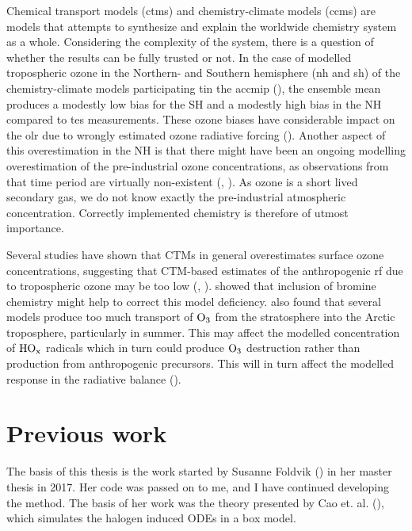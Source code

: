 \medskip

Chemical transport models (\acrshort{ctm}s) and chemistry-climate models (\acrshort{ccm}s) are models that attempts to synthesize and explain the worldwide chemistry system as a whole. Considering the complexity of the system, there is a question of whether the results can be fully trusted or not. In the case of modelled tropospheric ozone in the Northern- and Southern hemisphere (\acrshort{nh} and \acrshort{sh}) of the chemistry-climate models participating tin the \acrfull{accmip} (\cite{Bowman2013}), the ensemble mean produces a modestly low bias for the SH and a modestly high bias in the NH compared to \acrfull{tes} measurements. These ozone biases have considerable impact on the \acrfull{olr} due to wrongly estimated ozone radiative forcing (\cite{Bowman2013}). Another aspect of this overestimation in the NH is that there might have been an ongoing modelling overestimation of the pre-industrial ozone concentrations, as observations from that time period are virtually non-existent (\cite{shindell2003}, \cite{Parrish2014}). As ozone is a short lived secondary gas, we do not know exactly the pre-industrial atmospheric concentration. Correctly implemented chemistry is therefore of utmost importance.

\medskip

Several studies have shown that CTMs in general overestimates surface ozone concentrations, suggesting that CTM-based estimates of the anthropogenic \acrshort{rf} due to tropospheric ozone may be too low (\cite{WangJacob1998}, \cite{shindell2003}). \cite{Parella} showed that inclusion of bromine chemistry might help to correct this model deficiency. \cite{AMAP2015} also found that several models produce too much transport of $\mathrm{O_3}$ from the stratosphere into the Arctic troposphere, particularly in summer. This may affect the modelled concentration of $\mathrm{HO_x}$ radicals which in turn could produce $\mathrm{O_3}$ destruction rather than production from anthropogenic precursors. This will in turn affect the modelled response in the radiative balance (\cite{AMAP2015}). 


\section{Previous work}

The basis of this thesis is the work started by Susanne Foldvik (\cite{Susanne}) in her master thesis in 2017. Her code was passed on to me, and I have continued developing the method. The basis of her work was the theory presented by Cao et. al. (\cite{CAO}), which simulates the halogen induced ODEs in a box model.  


